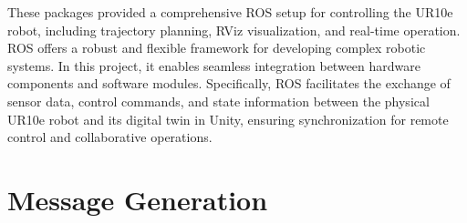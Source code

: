 These packages provided a comprehensive \ac{ROS} setup for controlling the UR10e robot, including trajectory planning, RViz visualization, and real-time operation. 
\ac{ROS} offers a robust and flexible framework for developing complex robotic systems. In this project, it enables seamless integration between hardware components and software modules. Specifically, \ac{ROS} facilitates the exchange of sensor data, control commands, and state information between the physical UR10e robot and its digital twin in Unity, ensuring synchronization for remote control and collaborative operations.


\section{Message Generation}

